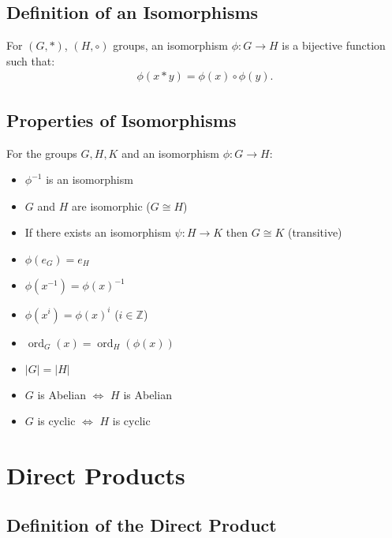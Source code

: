 \documentclass[a4paper, 12pt, twoside]{article}
\DeclareMathOperator{\Ord}{ord}
\begin{document}
\subsection{Definition of an Isomorphisms}

For $(G, *)$, $(H, \circ)$ groups, an isomorphism $\phi : G \to H$
is a bijective function such that:
\begin{align*}
      \phi(x * y) = \phi(x) \circ \phi(y). \tag{$\forall x, y \in G$}
\end{align*}

\newpage

\subsection{Properties of Isomorphisms}

For the groups $G, H, K$ and an isomorphism $\phi : G \to H$:

\begin{multicols}{2}
      \begin{itemize}
            \item $\phi^{-1}$ is an isomorphism
            \item $G$ and $H$ are isomorphic ($G \cong H$)
            \item If there exists an isomorphism $\psi:H \to K$
                  then $G \cong K$ (transitive)
            \item $\phi(e_G) = e_H$
            \item $\phi(x^{-1}) = \phi(x)^{-1}$
      \end{itemize}
      \columnbreak
      \begin{itemize}
            \item $\phi(x^i) = \phi(x)^i$ ($i \in \mathbb{Z}$)
            \item $\Ord_G(x) = \Ord_H(\phi(x))$
            \item $|G| = |H|$
            \item $G$ is Abelian $\Leftrightarrow$ $H$ is Abelian
            \item $G$ is cyclic $\Leftrightarrow$ $H$ is cyclic
      \end{itemize}
\end{multicols}

\section{Direct Products}

\subsection{Definition of the Direct Product}
\end{document}
